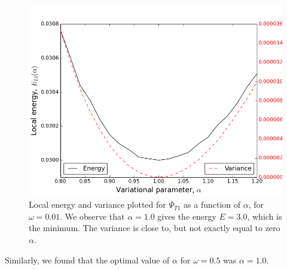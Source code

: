 \documentclass[norsk,a4paper,12pt]{article}
\begin{document}
\begin{figure} [H]
    \centering
    \includegraphics[scale=0.65]{E_L1_variance_omega=0_01_1e8.png}
    \caption{Local energy and variance plotted  for $\Psi_{T1}$ as a function of $\alpha$, for $\omega = 0.01$. We observe that $\alpha = 1.0$ gives the energy $E=3.0$, which is the minimum. The variance is close to, but not exactly equal to zero $\alpha$.}
    \label{fig:E_L1_file_omega=0_01}
\end{figure} 

Similarly, we found that the optimal value of $\alpha$ for $\omega = 0.5$ was $\alpha = 1.0$.
\end{document}
